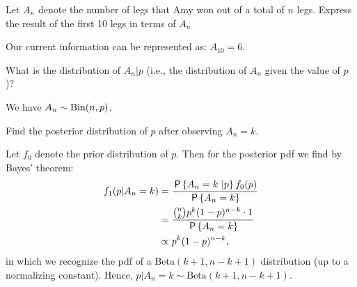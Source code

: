 \begin{exercise}
Let $A_n$ denote the number of legs that Amy won out of a total of $n$ legs. Express the result of the first 10 legs in terms of $A_n$
\begin{solution}
Our current information can be represented as: $A_{10} = 6$.
\end{solution}
\end{exercise}

\begin{exercise}
What is the distribution of $A_n | p$ (i.e., the distribution of $A_n$ given the value of $p$)?
\begin{solution}
We have $A_n \sim \Bin{n,p}$.
\end{solution}
\end{exercise}

\begin{exercise}
Find the posterior distribution of $p$ after observing $A_n = k$.
\begin{solution}
Let $f_0$ denote the prior distribution of $p$. Then for the posterior pdf we find by Bayes' theorem:
\begin{align}
    f_1(p|A_n = k) &= \frac{\P{A_n = k \ | p} f_0(p)}{\P{A_n = k}} \\
    &= \frac{{n \choose k} p^k (1-p)^{n-k} \cdot 1}{\P{A_n = k}} \\
    &\propto p^k (1-p)^{n-k},
\end{align}
in which we recognize the pdf of a $\text{Beta}(k+1,n-k+1)$ distribution (up to a normalizing constant). Hence, $p |A_n = k \sim \text{Beta}(k+1,n-k+1)$.
\end{solution}
\end{exercise}

